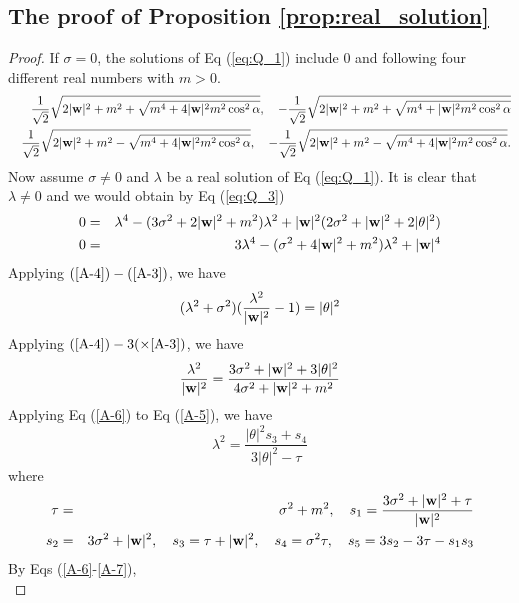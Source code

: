\documentclass[10pt,reqno]{amsart}
\renewcommand{\(}{\left(}
\renewcommand{\)}{\right)}
\newcommand{\bw}{{\bf w}}
\numberwithin{equation}{section}
\begin{document}
\subsection{The proof of Proposition  \ref{prop:real_solution}} \label{app-prop:real_solution}
\begin{proof}
If $\sigma=0$, the solutions of Eq (\ref{eq:Q_1}) include $0$ and following four different real numbers with $m>0$.
\begin{eqnarray*}
& & \frac{1}{\sqrt 2}\sqrt{2|\bw|^2+m^2+\sqrt{m^4 + 4|\bw|^2 m^2 \cos^2\alpha  }},\quad  - \frac{1}{\sqrt 2}\sqrt{2|\bw|^2+m^2+\sqrt{m^4 + |\bw|^2 m^2 \cos^2\alpha}} \\
& & \frac{1}{\sqrt 2}\sqrt{2|\bw|^2+m^2-\sqrt{m^4 + 4|\bw|^2 m^2 \cos^2\alpha}} ,\quad - \frac{1}{\sqrt 2}\sqrt{2|\bw|^2+m^2-\sqrt{m^4 + 4|\bw|^2 m^2 \cos^2\alpha}}.
\end{eqnarray*}
Now assume $\sigma\ne 0$ and $\lambda$ be a real solution of Eq (\ref{eq:Q_1}).  It is clear that $\lambda\neq 0$ and we would obtain by Eq (\ref{eq:Q_3})
\begin{eqnarray}
	0&=&\lambda^4 -  (3\sigma^2 + 2|\bw|^2 + m^2) \lambda^2 + |\bw|^2 (2\sigma^2 + |\bw|^2 + 2|\theta|^2) \label{A-3} \\
	0&=&3\lambda^4 - (\sigma^2 + 4|\bw|^2 + m^2)\lambda^2 + |\bw|^4   \label{A-4}
\end{eqnarray}
Applying $(\ref{A-4}) -(\ref{A-3})$, we have
\begin{equation}\label{A-5}
	(\lambda^2 + \sigma^2)(\frac{\lambda^2}{|\bw|^2}-1)= |\theta|^2
\end{equation}
Applying $(\ref{A-4})-3(\times\ref{A-3})$, we have
\begin{equation}\label{A-6}
	\frac{\lambda^2}{|\bw|^2}= \frac{3\sigma^2 + |\bw|^2 + 3 |\theta|^2}{4\sigma^2 + |\bw|^2 + m^2}
\end{equation}
Applying Eq (\ref{A-6})  to Eq  (\ref{A-5}), we have
\begin{equation}\label{A-7}
	\lambda^2 = \frac{|\theta|^2 s_3 + s_4}{3 |\theta|^2  - \tau}
\end{equation}
where 
\begin{eqnarray*}
\tau &=&\sigma^2+m^2, \quad	s_1 = \frac{3\sigma^2 + |\bw|^2 + \tau}{|\bw|^2}\\
 s_2 &=& 3\sigma^2+|\bw|^2, \quad s_3= \tau + |\bw|^2, \quad s_4 = \sigma^2 \tau, \quad s_5 = 3s_2 -3\tau-s_1s_3 
\end{eqnarray*}
By Eqs (\ref{A-6}-\ref{A-7}), 
\begin{equation}

\end{equation}
\end{proof}
\end{document}
